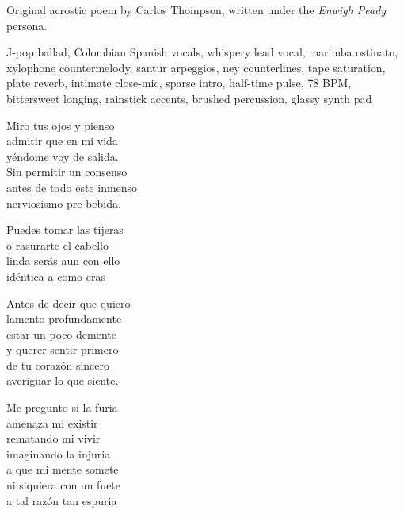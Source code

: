 
\begin{notes}
Original acrostic poem by Carlos Thompson, written under the \emph{Enwigh Peady} persona.
\end{notes}
\begin{style}
J-pop ballad, Colombian Spanish vocals, whispery lead vocal, marimba ostinato, xylophone countermelody, santur arpeggios, ney counterlines, tape saturation, plate reverb, intimate close-mic, sparse intro, half-time pulse, 78 BPM, bittersweet longing, rainstick accents, brushed percussion, glassy synth pad
\end{style}
\begin{lyrics}

Miro tus ojos y pienso\\
admitir que en mi vida\\
yéndome voy de salida.\\
Sin permitir un consenso\\
antes de todo este inmenso\\
nerviosismo pre-bebida.


Puedes tomar las tijeras\\
o rasurarte el cabello\\
linda serás aun con ello\\
idéntica a como eras


Antes de decir que quiero\\
lamento profundamente\\
estar un poco demente\\
y querer sentir primero\\
de tu corazón sincero\\
averiguar lo que siente.


Me pregunto si la furia\\
amenaza mi existir\\
rematando mi vivir\\
imaginando la injuria\\
a que mi mente somete\\
ni siquiera con un fuete\\
a tal razón tan espuria
\end{lyrics}

